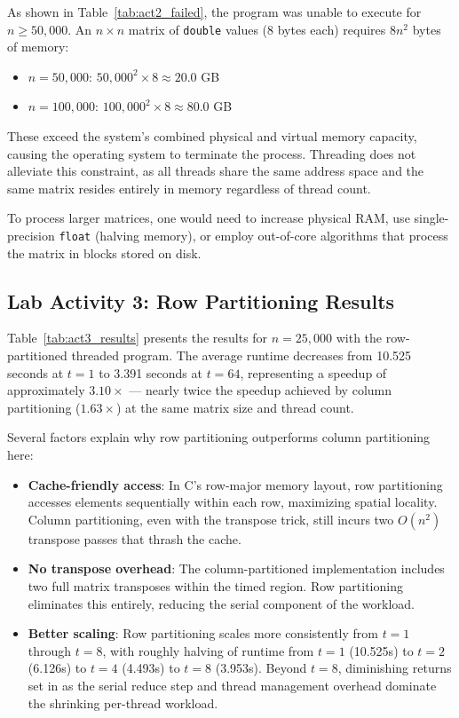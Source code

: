 \documentclass[journal]{IEEEtran}
\begin{document}
As shown in Table~\ref{tab:act2_failed}, the program was unable to execute for $n \geq 50{,}000$. An $n \times n$ matrix of \texttt{double} values (8 bytes each) requires $8n^2$ bytes of memory:
\begin{itemize}
    \item $n = 50{,}000$: $50{,}000^2 \times 8 \approx 20.0$ GB
    \item $n = 100{,}000$: $100{,}000^2 \times 8 \approx 80.0$ GB
\end{itemize}

These exceed the system's combined physical and virtual memory capacity, causing the operating system to terminate the process. Threading does not alleviate this constraint, as all threads share the same address space and the same matrix resides entirely in memory regardless of thread count.

To process larger matrices, one would need to increase physical RAM, use single-precision \texttt{float} (halving memory), or employ out-of-core algorithms that process the matrix in blocks stored on disk.

\subsection{Lab Activity 3: Row Partitioning Results}

Table~\ref{tab:act3_results} presents the results for $n = 25{,}000$ with the
row-partitioned threaded program. The average runtime decreases from 10.525 seconds
at $t = 1$ to 3.391 seconds at $t = 64$, representing a speedup of approximately
$3.10\times$ --- nearly twice the speedup achieved by column partitioning
($1.63\times$) at the same matrix size and thread count.

Several factors explain why row partitioning outperforms column partitioning here:

\begin{itemize}
    \item \textbf{Cache-friendly access}: In C's row-major memory layout, row
    partitioning accesses elements sequentially within each row, maximizing
    spatial locality. Column partitioning, even with the transpose trick, still
    incurs two $O(n^2)$ transpose passes that thrash the cache.

    \item \textbf{No transpose overhead}: The column-partitioned implementation
    includes two full matrix transposes within the timed region. Row partitioning
    eliminates this entirely, reducing the serial component of the workload.

    \item \textbf{Better scaling}: Row partitioning scales more consistently
    from $t = 1$ through $t = 8$, with roughly halving of runtime from
    $t = 1$ (10.525s) to $t = 2$ (6.126s) to $t = 4$ (4.493s) to $t = 8$
    (3.953s). Beyond $t = 8$, diminishing returns set in as the serial reduce
    step and thread management overhead dominate the shrinking per-thread workload.
\end{itemize}
\end{document}

